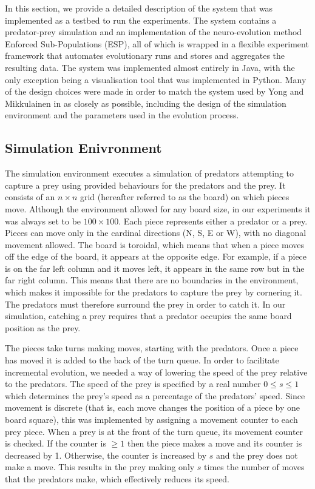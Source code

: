 \documentclass[12pt]{article} %
\begin{document}
In this section, we provide a detailed description of the system that was implemented as a testbed to run the experiments. The system contains a predator-prey simulation and an implementation of the neuro-evolution method Enforced Sub-Populations (ESP), all of which is wrapped in a flexible experiment framework that automates evolutionary runs and stores and aggregates the resulting data. The system was implemented almost entirely in Java, with the only exception being a visualisation tool that was implemented in Python. Many of the design choices were made in order to match the system used by Yong and Mikkulainen in \cite{Yong2001} as closely as possible, including the design of the simulation environment and the parameters used in the evolution process.

\subsection{Simulation Enivronment}

The simulation environment executes a simulation of predators attempting to capture a prey using provided behaviours for the predators and the prey. It consists of an $n\times n$ grid (hereafter referred to as the board) on which pieces move. Although the environment allowed for any board size, in our experiments it was always set to be $100 \times 100$. Each piece represents either a predator or a prey. Pieces can move only in the cardinal directions (N, S, E or W), with no diagonal movement allowed. The board is toroidal, which means that when a piece moves off the edge of the board, it appears at the opposite edge. For example, if a piece is on the far left column and it moves left, it appears in the same row but in the far right column. This means that there are no boundaries in the environment, which makes it impossible for the predators to capture the prey by cornering it. The predators must therefore surround the prey in order to catch it. In our simulation, catching a prey requires that a predator occupies the same board position as the prey.

The pieces take turns making moves, starting with the predators. Once a piece has moved it is added to the back of the turn queue. In order to facilitate incremental evolution, we needed a way of lowering the speed of the prey relative to the predators. The speed of the prey is specified by a real number $ 0 \leq s \leq 1$ which determines the prey's speed as a percentage of the predators' speed. Since movement is discrete (that is, each move changes the position of a piece by one board square), this was implemented by assigning a movement counter to each prey piece. When a prey is at the front of the turn queue, its movement counter is checked. If the counter is $\geq 1$ then the piece makes a move and its counter is decreased by 1. Otherwise, the counter is increased by $s$ and the prey does not make a move. This results in the prey making only $s$ times the number of moves that the predators make, which effectively reduces its speed.
\end{document}

